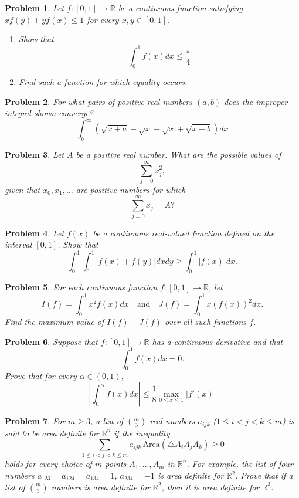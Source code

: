 \documentclass[12pt]{article}
\newtheorem{problem}{Problem}
\begin{document}
\begin{problem}
Let $f : [0, 1] \rightarrow \mathbb{R}$ be a continuous function satisfying $x f(y) + y f(x) \leq 1$ for every $x, y \in [0, 1]$.
\begin{enumerate}
    \item Show that
    \[
    \int_0^1 f(x) dx \leq \frac{\pi}{4}
    \]
    \item Find such a function for which equality occurs.
\end{enumerate}
\end{problem}

\begin{problem}
For what pairs of positive real numbers $(a, b)$ does the improper integral shown converge?
\[
\int_b^{\infty} \left( \sqrt{x+a} - \sqrt{x} - \sqrt{x} + \sqrt{x-b} \right) dx
\]
\end{problem}

\begin{problem}
Let $A$ be a positive real number. What are the possible values of
\[
\sum_{j=0}^{\infty} x_j^2,
\]
given that $x_0, x_1, \dots$ are positive numbers for which
\[
\sum_{j=0}^{\infty} x_j = A?
\]
\end{problem}

\begin{problem}
Let $f(x)$ be a continuous real-valued function defined on the interval $[0, 1]$. Show that
\[
\int_0^1 \int_0^1 |f(x) + f(y)| dx dy \geq \int_0^1 |f(x)| dx.
\]
\end{problem}

\begin{problem}
\textbf{\textcolor{red}{\heart}}
For each continuous function $f : [0, 1] \to \mathbb{R}$, let
\[
I(f) = \int_0^1 x^2 f(x) dx \quad \text{and} \quad J(f) = \int_0^1 x (f(x))^2 dx.
\]
Find the maximum value of $I(f) - J(f)$ over all such functions $f$.
\end{problem}

\begin{problem}
Suppose that $f : [0, 1] \to \mathbb{R}$ has a continuous derivative and that
\[
\int_0^1 f(x) dx = 0.
\]
Prove that for every $\alpha \in (0, 1)$,
\[
\left| \int_0^{\alpha} f(x) dx \right| \leq \frac{1}{8} \max_{0 \leq x \leq 1} |f'(x)|
\]
\end{problem}

\begin{problem}
For $m \geq 3$, a list of $\binom{m}{3}$ real numbers $a_{ijk}$ ($1 \leq i < j < k \leq m$) is said to be area definite for $\mathbb{R}^n$ if the inequality
\[
\sum_{1 \leq i < j < k \leq m} a_{ijk}\, \text{Area}(\triangle A_i A_j A_k) \geq 0
\]
holds for every choice of $m$ points $A_1, \ldots, A_m$ in $\mathbb{R}^n$. For example, the list of four numbers $a_{123} = a_{124} = a_{134} = 1$, $a_{234} = -1$ is area definite for $\mathbb{R}^2$. Prove that if a list of $\binom{m}{3}$ numbers is area definite for $\mathbb{R}^2$, then it is area definite for $\mathbb{R}^3$.
\end{problem}
\end{document}
